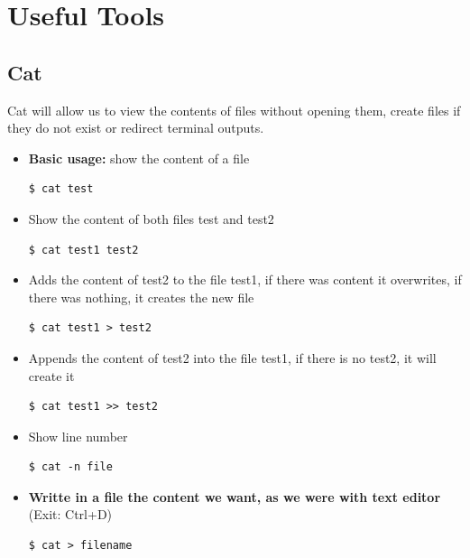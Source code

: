 \documentclass{article}
\newenvironment{codetemplate}[1][]{%
  \mybasecolorbox[#1]
  \itshape
}{%
  \endmybasecolorbox
}
\begin{document}
\newpage
\section{Useful Tools}

\subsection{Cat}
Cat will allow us to view the contents of files without opening them, create files if they do not exist or redirect terminal outputs.

\begin{itemize}
    \item \textbf{Basic usage:} show the content of a file
\begin{codetemplate}{}
\begin{verbatim}
$ cat test
\end{verbatim}
\end{codetemplate}

    \item Show the content of both files test and test2
\begin{codetemplate}{}
\begin{verbatim}
$ cat test1 test2
\end{verbatim}
\end{codetemplate}

    \item Adds the content of test2 to the file test1, if there was content it overwrites, if there was nothing, it creates the new file
\begin{codetemplate}{}
\begin{verbatim}
$ cat test1 > test2
\end{verbatim}
\end{codetemplate}

    \item Appends the content of test2 into the file test1, if there is no test2, it will create it
\begin{codetemplate}{}
\begin{verbatim}
$ cat test1 >> test2
\end{verbatim}
\end{codetemplate}

    \item Show line number
\begin{codetemplate}{}
\begin{verbatim}
$ cat -n file
\end{verbatim}
\end{codetemplate}

    \item \textbf{Writte in a file the content we want, as we were with text editor} (Exit: Ctrl+D)
\begin{codetemplate}{}
\begin{verbatim}
$ cat > filename
\end{verbatim}
\end{codetemplate}
\end{itemize}
\end{document}
